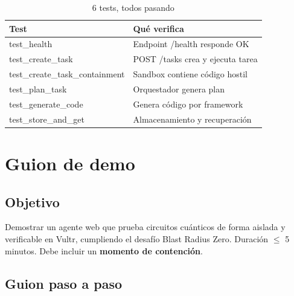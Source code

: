 \documentclass[11pt,a4paper]{article}
\begin{document}
\begin{table}[h]
\centering
\begin{tabular}{ll}
\toprule
\textbf{Test} & \textbf{Qué verifica} \\
\midrule
test\_health & Endpoint /health responde OK \\
test\_create\_task & POST /tasks crea y ejecuta tarea \\
test\_create\_task\_containment & Sandbox contiene código hostil \\
test\_plan\_task & Orquestador genera plan \\
test\_generate\_code & Genera código por framework \\
test\_store\_and\_get & Almacenamiento y recuperación \\
\bottomrule
\end{tabular}
\caption{6 tests, todos pasando}
\end{table}

\section{Guion de demo}

\subsection{Objetivo}

Demostrar un agente web que prueba circuitos cuánticos de forma aislada y
verificable en Vultr, cumpliendo el desafío Blast Radius Zero. Duración
$\leq$ 5 minutos. Debe incluir un \textbf{momento de contención}.

\subsection{Guion paso a paso}
\end{document}
